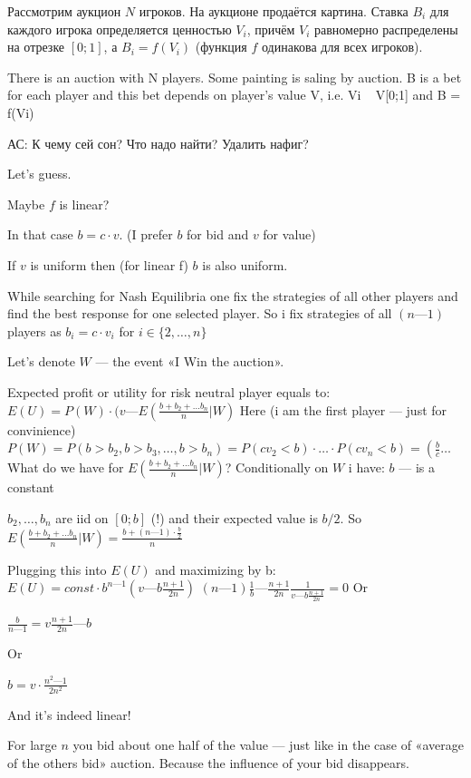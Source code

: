 \begin{problem}

Рассмотрим аукцион $N$ игроков. На аукционе продаётся картина. Ставка $B_i$ для каждого игрока определяется ценностью $V_i$, причём $V_i$ равномерно распределены на отрезке $[0;1]$, а $B_i = f(V_i)$ (функция $f$ одинакова для всех игроков).

There is an auction with N players. Some painting is saling by auction. B is a bet for each player and this bet depends on player's value V, i.e. Vi ~ V[0;1] and B = f(Vi)

{\red АС: К чему сей сон? Что надо найти? Удалить нафиг?}


\begin{sol}

Let's guess.\par

Maybe $f$ is linear? \par
In that case $b = c\cdot v$. (I prefer $b$ for bid and $v$ for value) \par
If $v$ is uniform then (for linear f) $b$ is also uniform. \par

While searching for Nash Equilibria one fix the strategies of all other players and find the best response for one selected player. So i fix strategies of all $(n — 1)$ players as $b_{i} = c\cdot v_{i}$ for $i\in\{2,\ldots,n\}$\par

Let's denote $W$ — the event «I Win the auction».\par

Expected profit or utility for risk neutral player equals to:
$E(U) = P(W)\cdot (v — E(\frac {b + b_{2} + \ldots b_{n}}{n}|W)$
Here (i am the first player — just for convinience)
$P(W) = P(b > b_{2}, b > b_{3}, \ldots, b > b_{n}) = P(cv_{2} < b)\cdot\ldots \cdot P(cv_{n} < b) = \left(\frac {b}{c}\right. \ldots$
What do we have for $E\left(\frac {b + b_{2} + \ldots b_{n}}{n}|W\right)$?
Conditionally on $W$ i have:
$b$ — is a constant\par
$b_{2}, \ldots,b_{n}$ are iid on $[0;b]$ (!) and their expected value is $b/2$.
So $E\left(\frac {b + b_{2} + \ldots b_{n}}{n}|W\right) = \frac {b + (n — 1)\cdot \frac {b}{2}}{n}$ \par

Plugging this into $E(U)$ and maximizing by b:
$E(U) = const\cdot b^{n — 1}(v — b\frac {n + 1}{2n})$
$(n — 1)\frac {1}{b} — \frac {n + 1}{2n}\frac {1}{v — b\frac {n + 1}{2n}} = 0$
Or\par
$\frac {b}{n — 1} = v\frac {n + 1}{2n} — b$\par
Or\par
$b = v\cdot \frac {n^2 — 1}{2n^{2}}$\par
And it's indeed linear!\par

For large $n$ you bid about one half of the value — just like in the case of «average of the others bid» auction. Because the influence of your bid disappears.
\end{sol}
\end{problem}




